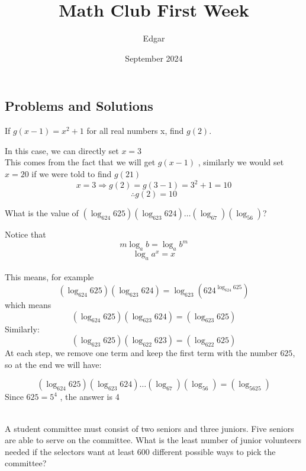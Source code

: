 \documentclass[12pt]{article}
\title{Math Club First Week}
\author{Edgar}
\date{September 2024}
\newcounter{problem}
\begin{document}
\maketitle

 \begin{spacing}{1.3}

\section*{Problems and Solutions}

\begin{problem}[A][1]
   If $g(x-1) = x^2+1$ for all real numbers x, find $g(2)$.
\end{problem}

\begin{solution}
   In this case, we can directly set $x=3$ \\
   This comes from the fact that we will get $g(x-1)$ , similarly we would set $x=20$ if we were told to find $g(21)$
   $$ x=3 \Rightarrow g(2) = g(3-1) = 3^2+1=10$$
   $$ \therefore g(2)=10$$
\end{solution}

\begin{problem}[A][2]
   What is the value of $ (\log_{624}625)(\log_{623}624)\ldots(\log_67)(\log_56) $?
\end{problem}    

\begin{solution}[4]
   Notice that \\
      $$m\log_ab = \log_ab^m$$
      $$\log_aa^x = x$$
      \\
      This means, for example     
      \[
      \left( \log_{624} 625 \right) \left( \log_{623} 624 \right) = \log_{623} \left( 624^{\log_{624} 625} \right)
      \]
      which means
      $$(\log_{624}625)(\log_{623}624) = (\log_{623}625)$$
      Similarly:
      $$(\log_{623}625)(\log_{622}623) = (\log_{622}625)$$
      At each step, we remove one term and keep the first term with the number $625$, so at the end we will have:

      $$(\log_{624}625)(\log_{623}624)\ldots(\log_67)(\log_56) = (\log_5625)$$   
      Since $625=5^4$ , the answer is 4 \\ \\

\end{solution}


\begin{problem}[C][2]
   A student committee must consist of two seniors and three juniors. Five seniors are able to
   serve on the committee. What is the least number of junior volunteers needed if the selectors
   want at least 600 different possible ways to pick the committee? \\
\end{problem}


\end{spacing}
\end{document}
